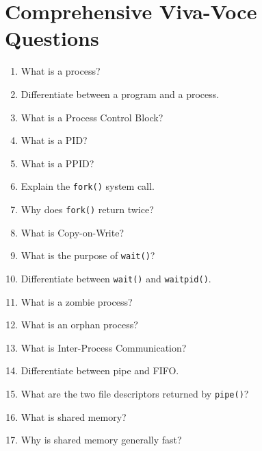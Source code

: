 \documentclass[12pt,a4paper]{report}
\begin{document}

\chapter*{Comprehensive Viva-Voce Questions}

\begin{enumerate}

    \item What is a process?

    \item Differentiate between a program and a process.

    \item What is a Process Control Block?

    \item What is a PID?

    \item What is a PPID?

    \item Explain the \texttt{fork()} system call.

    \item Why does \texttt{fork()} return twice?

    \item What is Copy-on-Write?

    \item What is the purpose of \texttt{wait()}?

    \item Differentiate between \texttt{wait()} and \texttt{waitpid()}.

    \item What is a zombie process?

    \item What is an orphan process?

    \item What is Inter-Process Communication?

    \item Differentiate between pipe and FIFO.

    \item What are the two file descriptors returned by \texttt{pipe()}?

    \item What is shared memory?

    \item Why is shared memory generally fast?


\end{enumerate}
\end{document}
